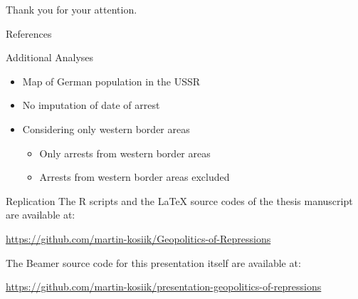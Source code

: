 \documentclass[11pt]{beamer}
\begin{document}
{
\begin{frame}[standout]
  Thank you for your attention.
\end{frame}
}

\appendix

\begin{frame}[allowframebreaks]{References}
\printbibliography
\end{frame}

\begin{frame}[label=add_content]{Additional Analyses}
\begin{itemize}
    \item Map of German population in the USSR \hyperlink{map_counts}{}
    \item No imputation of date of arrest
    \hyperlink{did_no_date_imputation}{} 
    \hyperlink{sc_no_date_imputation}{} 
    \item Considering only western border areas 
    \begin{itemize}
        \item   Only arrests from western border areas 
        \hyperlink{did_border_area_west}{} 
      \hyperlink{sc_border_area_west}{} 
        \item Arrests from western border areas excluded
         \hyperlink{did_non_border_area_west}{} 
      \hyperlink{sc_non_border_area_west}{} 
        
    \end{itemize}
\end{itemize}
\end{frame}


\begin{frame}{Replication}
The R scripts and the LaTeX source codes of the thesis manuscript are available at:
  \begin{center}\url{https://github.com/martin-kosiik/Geopolitics-of-Repressions}\end{center}

The Beamer source code for this presentation itself are available at: 
\begin{center}\url{https://github.com/martin-kosiik/presentation-geopolitics-of-repressions}\end{center}
\end{frame}
\end{document}
